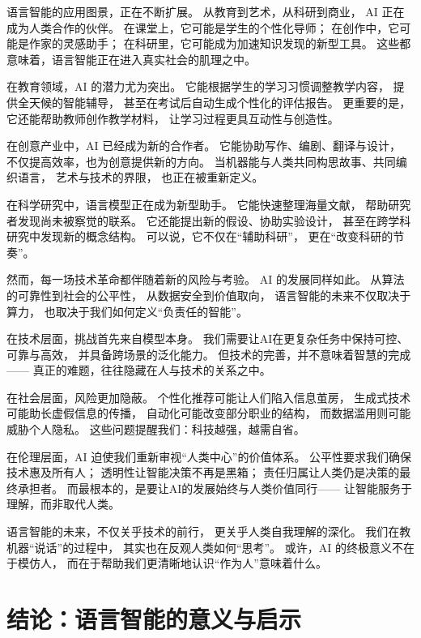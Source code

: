 语言智能的应用图景，正在不断扩展。  
从教育到艺术，从科研到商业，  
AI 正在成为人类合作的伙伴。  
在课堂上，它可能是学生的个性化导师；  
在创作中，它可能是作家的灵感助手；  
在科研里，它可能成为加速知识发现的新型工具。  
这些都意味着，语言智能正在进入真实社会的肌理之中。  

在教育领域，AI 的潜力尤为突出。  
它能根据学生的学习习惯调整教学内容，  
提供全天候的智能辅导，  
甚至在考试后自动生成个性化的评估报告。  
更重要的是，它还能帮助教师创作教学材料，  
让学习过程更具互动性与创造性。  

在创意产业中，AI 已经成为新的合作者。  
它能协助写作、编剧、翻译与设计，  
不仅提高效率，也为创意提供新的方向。  
当机器能与人类共同构思故事、共同编织语言，  
艺术与技术的界限，  
也正在被重新定义。  

在科学研究中，语言模型正在成为新型助手。  
它能快速整理海量文献，  
帮助研究者发现尚未被察觉的联系。  
它还能提出新的假设、协助实验设计，  
甚至在跨学科研究中发现新的概念结构。  
可以说，它不仅在“辅助科研”，  
更在“改变科研的节奏”。  

然而，每一场技术革命都伴随着新的风险与考验。  
AI 的发展同样如此。  
从算法的可靠性到社会的公平性，  
从数据安全到价值取向，  
语言智能的未来不仅取决于算力，  
也取决于我们如何定义“负责任的智能”。  

在技术层面，挑战首先来自模型本身。  
我们需要让AI在更复杂任务中保持可控、可靠与高效，  
并具备跨场景的泛化能力。  
但技术的完善，并不意味着智慧的完成——  
真正的难题，往往隐藏在人与技术的关系之中。  

在社会层面，风险更加隐蔽。  
个性化推荐可能让人们陷入信息茧房，  
生成式技术可能助长虚假信息的传播，  
自动化可能改变部分职业的结构，  
而数据滥用则可能威胁个人隐私。  
这些问题提醒我们：科技越强，越需自省。  

在伦理层面，AI 迫使我们重新审视“人类中心”的价值体系。  
公平性要求我们确保技术惠及所有人；  
透明性让智能决策不再是黑箱；  
责任归属让人类仍是决策的最终承担者。  
而最根本的，是要让AI的发展始终与人类价值同行——  
让智能服务于理解，而非取代人类。  

语言智能的未来，不仅关乎技术的前行，  
更关乎人类自我理解的深化。  
我们在教机器“说话”的过程中，  
其实也在反观人类如何“思考”。  
或许，AI 的终极意义不在于模仿人，  
而在于帮助我们更清晰地认识“作为人”意味着什么。  

\section{结论：语言智能的意义与启示}

